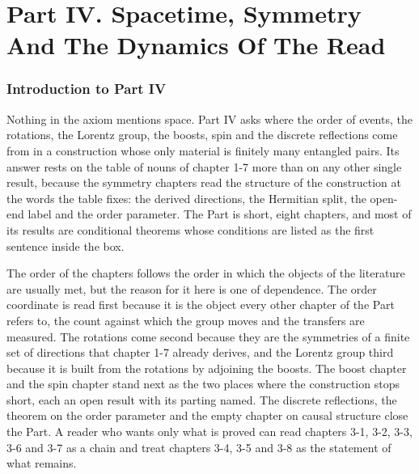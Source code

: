 \clearpage
\part*{Part IV. Spacetime, Symmetry And The Dynamics Of The Read}
\label{atlaspart:04-spacetime-and-symmetry}
\section*{Introduction to Part IV}\label{narr:part:III}
Nothing in the axiom mentions space. Part IV asks where the order of events, the rotations, the Lorentz group, the boosts, spin and the discrete reflections come from in a construction whose only material is finitely many entangled pairs. Its answer rests on the table of nouns of chapter 1-7 more than on any other single result, because the symmetry chapters read the structure of the construction at the words the table fixes: the derived directions, the Hermitian split, the open-end label and the order parameter. The Part is short, eight chapters, and most of its results are conditional theorems whose conditions are listed as the first sentence inside the box.

The order of the chapters follows the order in which the objects of the literature are usually met, but the reason for it here is one of dependence. The order coordinate is read first because it is the object every other chapter of the Part refers to, the count against which the group moves and the transfers are measured. The rotations come second because they are the symmetries of a finite set of directions that chapter 1-7 already derives, and the Lorentz group third because it is built from the rotations by adjoining the boosts. The boost chapter and the spin chapter stand next as the two places where the construction stops short, each an open result with its parting named. The discrete reflections, the theorem on the order parameter and the empty chapter on causal structure close the Part. A reader who wants only what is proved can read chapters 3-1, 3-2, 3-3, 3-6 and 3-7 as a chain and treat chapters 3-4, 3-5 and 3-8 as the statement of what remains.

